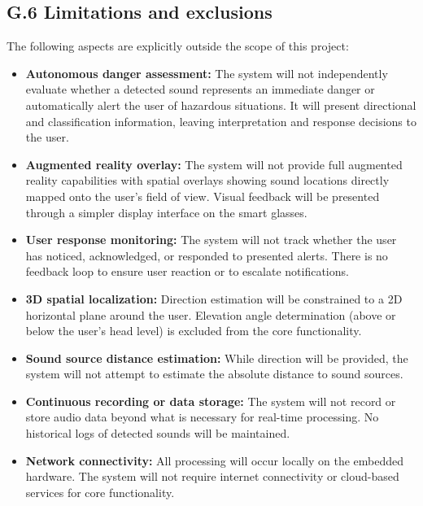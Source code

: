 \documentclass[12pt]{article}
\theoremstyle{definition}
\begin{document}
\subsection{G.6 Limitations and exclusions}

The following aspects are explicitly outside the scope of this project:

\begin{itemize}
\item \textbf{Autonomous danger assessment:} The system will not independently
evaluate whether a detected sound represents an immediate danger or
automatically alert the user of hazardous situations. It will present
directional and classification information, leaving interpretation and response
decisions to the user.

\item \textbf{Augmented reality overlay:} The system will not provide full
augmented reality capabilities with spatial overlays showing sound locations
directly mapped onto the user's field of view. Visual feedback will be presented
through a simpler display interface on the smart glasses.

\item \textbf{User response monitoring:} The system will not track whether the
user has noticed, acknowledged, or responded to presented alerts. There is no
feedback loop to ensure user reaction or to escalate notifications.

\item \textbf{3D spatial localization:} Direction estimation will be constrained
to a 2D horizontal plane around the user. Elevation angle determination (above
or below the user's head level) is excluded from the core functionality.

\item \textbf{Sound source distance estimation:} While direction will be
provided, the system will not attempt to estimate the absolute distance to sound
sources.

\item \textbf{Continuous recording or data storage:} The system will not record
or store audio data beyond what is necessary for real-time processing. No
historical logs of detected sounds will be maintained.

\item \textbf{Network connectivity:} All processing will occur locally on the
embedded hardware. The system will not require internet connectivity or
cloud-based services for core functionality.
\end{itemize}
\end{document}
